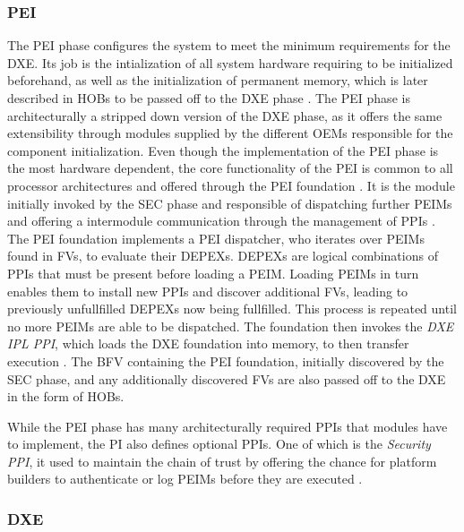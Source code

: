 \subsubsection{\acf{PEI}}

The \ac{PEI} phase configures the system to meet the minimum requirements for the \ac{DXE}.
Its job is the intialization of all system hardware requiring to be initialized beforehand, as well as the initialization of permanent memory, which is later described in \acp{HOB} to be passed off to the \ac{DXE} phase \cite[Vol. 1, 2.1]{pi-spec}.
The \ac{PEI} phase is architecturally a stripped down version of the \ac{DXE} phase, as it offers the same extensibility through modules supplied by the different \acp{OEM} responsible for the component initialization.
Even though the implementation of the \ac{PEI} phase is the most hardware dependent, the core functionality of the \ac{PEI} is common to all processor architectures and offered through the \ac{PEI} foundation \cite[Vol. 1, 2.2]{pi-spec}.
It is the module initially invoked by the \ac{SEC} phase and responsible of dispatching further \acp{PEIM} and offering a intermodule communication through the management of \acp{PPI} \cite[Vol. 1, 2.5]{pi-spec}.
The \ac{PEI} foundation implements a \ac{PEI} dispatcher, who iterates over \acp{PEIM} found in \acp{FV}, to evaluate their \acp{DEPEX}.
\acp{DEPEX} are logical combinations of \acp{PPI} that must be present before loading a \ac{PEIM}.
Loading \acp{PEIM} in turn enables them to install new \acp{PPI} and discover additional \acp{FV}, leading to previously unfullfilled \acp{DEPEX} now being fullfilled.
This process is repeated until no more \acp{PEIM} are able to be dispatched.
The foundation then invokes the \emph{\ac{DXE} IPL \ac{PPI}}, which loads the \ac{DXE} foundation into memory, to then transfer execution \cite[Vol. 1, 2.6]{pi-spec}.
The \ac{BFV} containing the \ac{PEI} foundation, initially discovered by the \ac{SEC} phase, and any additionally discovered \acp{FV} are also passed off to the \ac{DXE} in the form of \acp{HOB}.

While the \ac{PEI} phase has many architecturally required \acp{PPI} that modules have to implement, the \ac{PI} also defines optional \acp{PPI}.
One of which is the \emph{Security PPI}, it used to maintain the chain of trust by offering the chance for platform builders to authenticate or log \acp{PEIM} before they are executed \cite[Vol. 1, 6.3.6]{pi-spec}.


\subsubsection{\acf{DXE}}


